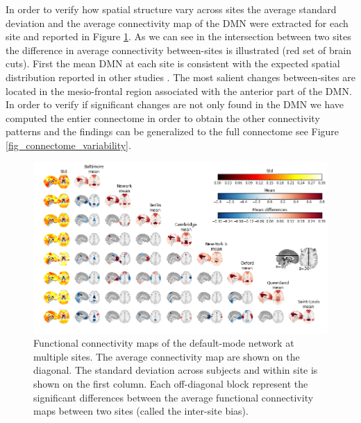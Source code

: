 \documentclass[authoryear]{elsarticle}
\begin{document}
In order to verify how spatial structure vary across sites the average standard deviation and the average connectivity map of the DMN were extracted for each site and reported in Figure \ref{fig_DMN_variability}. As we can see in the intersection between two sites the difference in average connectivity between-sites is illustrated (red set of brain cuts). First the mean DMN at each site is consistent with the expected spatial distribution reported in other studies \citep{Damoiseaux2006,Dansereau2014,Yan2013a}. The most salient changes between-sites are located in the mesio-frontal region associated with the anterior part of the DMN. In order to verify if significant changes are not only found in the DMN we have computed the entier connectome in order to obtain the other connectivity patterns and the findings can be generalized to the full connectome see Figure \ref{fig_connectome_variability}.

\begin{figure}[tbp]
\begin{center}
\includegraphics[width=\linewidth]{../figures/pccmap_multisite.png}
\end{center}
\caption[DMN variability across sites]{
Functional connectivity maps of the default-mode network at multiple sites. The average connectivity map are shown on the diagonal. The standard deviation across subjects and within site is shown on the first column. Each off-diagonal block represent the significant differences between the average functional connectivity maps between two sites (called the inter-site bias).
}
\label{fig_DMN_variability}
\end{figure}
\end{document}
